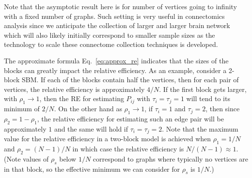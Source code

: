\documentclass[10pt,letterpaper]{article}
\begin{document}
Note that the asymptotic result here is for number of vertices going to infinity with a fixed number of graphs. Such setting is very useful in connectomics analysis since we anticipate the collection of larger and larger brain network which will also likely initially correspond to smaller sample sizes as the technology to scale these connectome collection techniques is developed.

The approximate formula Eq.~\ref{eq:approx_re} indicates that the sizes of the blocks can greatly impact the relative efficiency.
As an example, consider a 2-block SBM. 
If each of the blocks contain half the vertices, then for each pair of vertices, the relative efficiency is approximately $4/N$. 
If the first block gets larger, with $\rho_1\to 1$, then the RE for estimating $P_{ij}$ with $\tau_i=\tau_j=1$ will tend to its minimum of $2/N$. 
On the other hand as $\rho_1\to 1$, if $\tau_i=1$ and $\tau_j=2$, then since $\rho_2=1-\rho_1$, the relative efficiency for estimating such an edge pair will be approximately $1$ and the same will hold if $\tau_i=\tau_j=2$.
Note that the maximum value for the relative efficiency in a two-block model is achieved when $\rho_1=1/N$ and $\rho_2=(N-1)/N$ in which case the relative efficiency is $N/(N-1) \approx 1$.
(Note values of $\rho_s$ below $1/N$ correspond to graphs where typically no vertices are in that block, so the effective minimum we can consider for $\rho_s$ is $1/N$.)

\end{document}
